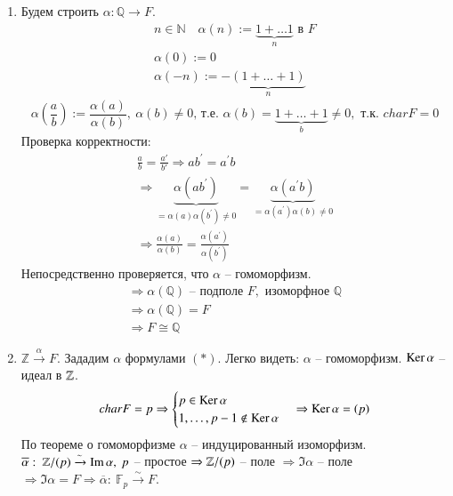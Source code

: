 \documentclass[main]{subfiles}
\begin{document}
\begin{longProof}
    \begin{enumerate}
        \item Будем строить $\alpha: \mathbb{Q} \rightarrow F$.
        \[\left. \begin{gathered}
         n \in \mathbb{N} \quad \alpha(n) := \underbrace{1 + \ldots 1}_n \text{ в } F \\
            \alpha(0) := 0 \\
            \alpha(-n) := -\underbrace{(1 + \ldots + 1)}_n 
        \end{gathered}
        \right. \tag*{(*)} \]
        \[\alpha \left(  \frac{a}{b} \right) := \frac{\alpha(a)}{\alpha(b)}, \ \alpha(b) \ne 0 
        \text{, т.е. } \alpha(b) = \underbrace{1 + \ldots + 1}_b \neq 0, \text{ т.к. } char F = 0\]
        Проверка корректности:
        \begin{gather*}  
            \frac{a}{b} = \frac{a\prime}{b\prime} \Rightarrow ab^\prime = a^\prime b \\
            \Rightarrow \underbrace{\alpha(a b^\prime)}_{=\alpha(a)\alpha(b^\prime) \ne 0}
             = \underbrace{\alpha(a^\prime b)}_{=\alpha(a^\prime)\alpha(b) \ne 0} \\
            \Rightarrow \frac{\alpha(a)}{\alpha(b)} = 
            \frac{\alpha(a^\prime)}{\alpha(b^\prime)} 
        \end{gather*}
        Непосредственно проверяется, что $\alpha$ -- гомоморфизм.
        \begin{gather*}
            \Rightarrow \alpha(\mathbb{Q}) \text{ -- подполе } F, \text{ изоморфное } \mathbb{Q}\\
            \Rightarrow \alpha(\mathbb{Q}) = F \\
            \Rightarrow F \cong \mathbb{Q}
        \end{gather*}
        \item
         $\mathbb{Z} \stackrel{\alpha}{\longrightarrow} F$. Зададим $\alpha$ формулами $(*)$. Легко видеть:
        $ \alpha $ -- гомоморфизм. $\operatorname{Ker} \alpha$ -- идеал в $\mathbb{Z}$.
        \begin{gather*}
            char F = p \Rightarrow \begin{cases}
                p \in \operatorname{Ker} \alpha \\
                1, \ldots, p-1 \notin \operatorname{Ker} \alpha
            \end{cases} \Rightarrow \operatorname{Ker} \alpha = (p)
        \end{gather*}
        По теореме о гомоморфизме $\alpha$ -- индуцированный изоморфизм. $\overline{\alpha}: \ \mathbb{Z} / (p) 
        \xrightarrow{\sim} \operatorname{Im} \alpha, \ p$ -- простое $\Rightarrow \mathbb{Z} / (p) $ -- поле 
            $\Rightarrow \Im \alpha$ -- поле
            $\Rightarrow \Im \alpha = F \Rightarrow
            \overline{\alpha}: \ \mathbb{F}_p \xrightarrow{\sim} F$.
    \end{enumerate}
\end{longProof}
\end{document}
